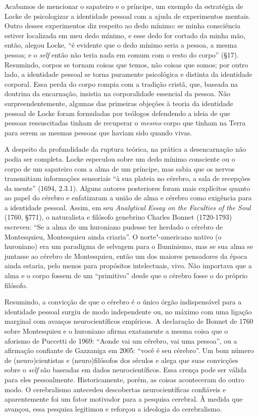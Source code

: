 Acabamos de mencionar o sapateiro e o príncipe, um exemplo da estratégia
de Locke de psicologizar a identidade pessoal com a ajuda de
experimentos mentais. Outro desses experimentos diz respeito ao dedo
mínimo: se minha consciência estiver localizada em meu dedo mínimo, e
esse dedo for cortado da minha mão, então, alegou Locke, ``é
evidente que o dedo mínimo seria a pessoa, a mesma pessoa; e o \emph{self}
então não teria nada em comum com o resto do corpo'' (§17). Resumindo,
corpos se tornam coisas que temos, não coisas que somos; por outro lado,
a identidade pessoal se torna puramente psicológica e distinta da
identidade corporal. Essa perda do corpo rompia com a tradição cristã,
que, baseada na doutrina da encarnação, insistia na
corporalidade essencial da pessoa. Não surpreendentemente, algumas das primeiras
objeções à teoria da identidade pessoal de Locke foram formuladas por
teólogos defendendo a ideia de que pessoas ressuscitadas tinham de
recuperar o \emph{mesmo} corpo que tinham na Terra para serem as mesmas
pessoas que haviam sido quando vivas.

A despeito da profundidade da ruptura teórica, na prática a
desencarnação não podia ser completa. Locke especulou sobre um dedo
mínimo consciente ou o corpo de um sapateiro com a alma de um príncipe,
mas sabia que os nervos transmitiam informações sensoriais ``à sua
plateia no cérebro, a sala de recepções da mente'' (1694, 2.3.1). Alguns
autores posteriores foram mais explícitos quanto ao papel do cérebro e
enfatizaram a união de alma e cérebro como exigência para a identidade
pessoal. Assim, em seu \emph{Analytical Essay on the Faculties of the
Soul} (1760, §771), o naturalista e filósofo genebrino Charles Bonnet
(1720-1793) escreveu: ``Se a alma de um huroniano pudesse ter herdado o
cérebro de Montesquieu, Montesquieu ainda criaria''. O norte"-americano
nativo (o huroniano) era um paradigma de selvagem para o Iluminismo, mas
se sua alma se juntasse ao cérebro de Montesquieu, então um dos maiores
pensadores da época ainda estaria, pelo menos para propósitos
intelectuais, vivo. Não importava que a alma e o corpo fossem de um
``primitivo'' desde que o cérebro fosse o do próprio filósofo.

Resumindo, a convicção de que o cérebro é o único órgão indispensável
para a identidade pessoal surgiu de modo independente ou, no máximo com
uma ligação marginal com avanços neurocientíficos empíricos. A
declaração de Bonnet de 1760 sobre Montesquieu e o huroniano afirma
exatamente a mesma coisa que o aforismo de Puccetti de 1969: ``Aonde vai
um cérebro, vai uma pessoa'', ou a afirmação confiante de Gazzaniga em
2005: ``você é seu cérebro''. Um bom número de (neuro)cientistas e
(neuro)filósofos dos séculos  e  alega que suas convicções sobre o
\emph{self} são baseadas em dados neurocientíficos. Essa crença pode ser válida
para eles pessoalmente. Historicamente, porém, as coisas aconteceram do
outro modo. O cerebralismo antecedeu descobertas neurocientíficas
confiáveis e aparentemente foi um fator motivador para a pesquisa
cerebral. À medida que avançou, essa pesquisa legitimou e reforçou a
ideologia do cerebralismo.

